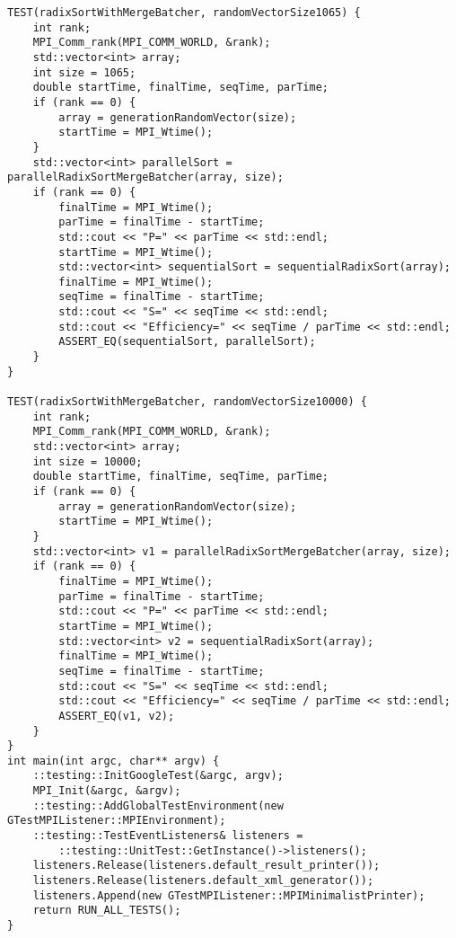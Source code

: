 \documentclass{report}
\begin{document}
\begin{lstlisting}
TEST(radixSortWithMergeBatcher, randomVectorSize1065) {
    int rank;
    MPI_Comm_rank(MPI_COMM_WORLD, &rank);
    std::vector<int> array;
    int size = 1065;
    double startTime, finalTime, seqTime, parTime;
    if (rank == 0) {
        array = generationRandomVector(size);
        startTime = MPI_Wtime();
    }
    std::vector<int> parallelSort = parallelRadixSortMergeBatcher(array, size);
    if (rank == 0) {
        finalTime = MPI_Wtime();
        parTime = finalTime - startTime;
        std::cout << "P=" << parTime << std::endl;
        startTime = MPI_Wtime();
        std::vector<int> sequentialSort = sequentialRadixSort(array);
        finalTime = MPI_Wtime();
        seqTime = finalTime - startTime;
        std::cout << "S=" << seqTime << std::endl;
        std::cout << "Efficiency=" << seqTime / parTime << std::endl;
        ASSERT_EQ(sequentialSort, parallelSort);
    }
}

TEST(radixSortWithMergeBatcher, randomVectorSize10000) {
    int rank;
    MPI_Comm_rank(MPI_COMM_WORLD, &rank);
    std::vector<int> array;
    int size = 10000;
    double startTime, finalTime, seqTime, parTime;
    if (rank == 0) {
        array = generationRandomVector(size);
        startTime = MPI_Wtime();
    }
    std::vector<int> v1 = parallelRadixSortMergeBatcher(array, size);
    if (rank == 0) {
        finalTime = MPI_Wtime();
        parTime = finalTime - startTime;
        std::cout << "P=" << parTime << std::endl;
        startTime = MPI_Wtime();
        std::vector<int> v2 = sequentialRadixSort(array);
        finalTime = MPI_Wtime();
        seqTime = finalTime - startTime;
        std::cout << "S=" << seqTime << std::endl;
        std::cout << "Efficiency=" << seqTime / parTime << std::endl;
        ASSERT_EQ(v1, v2);
    }
}
int main(int argc, char** argv) {
    ::testing::InitGoogleTest(&argc, argv);
    MPI_Init(&argc, &argv);
    ::testing::AddGlobalTestEnvironment(new GTestMPIListener::MPIEnvironment);
    ::testing::TestEventListeners& listeners =
        ::testing::UnitTest::GetInstance()->listeners();
    listeners.Release(listeners.default_result_printer());
    listeners.Release(listeners.default_xml_generator());
    listeners.Append(new GTestMPIListener::MPIMinimalistPrinter);
    return RUN_ALL_TESTS();
}
\end{lstlisting}
\end{document}
